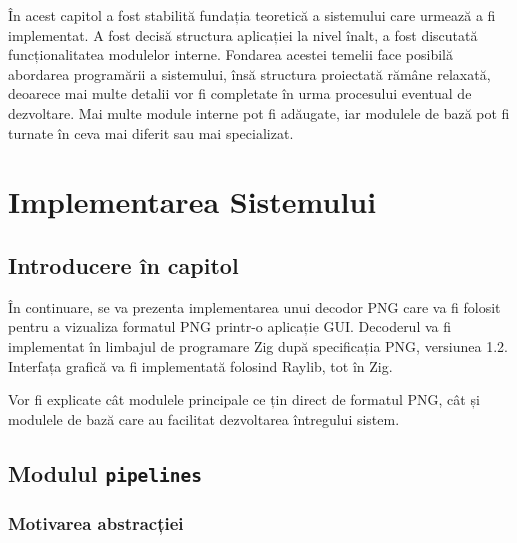 \documentclass[a4paper,12pt]{report}
\begin{document}

În acest capitol a fost stabilită fundația teoretică a sistemului care urmează a fi implementat.
A fost decisă structura aplicației la nivel înalt, a fost discutată funcționalitatea modulelor interne.
Fondarea acestei temelii face posibilă abordarea programării a sistemului,
însă structura proiectată rămâne relaxată, deoarece mai multe detalii
vor fi completate în urma procesului eventual de dezvoltare.
Mai multe module interne pot fi adăugate,
iar modulele de bază pot fi turnate în ceva mai diferit sau mai specializat.

\chapter{Implementarea Sistemului}\label{implementation_chapter_title}

\section{Introducere în capitol}

În continuare, se va prezenta implementarea unui decodor \ac{PNG} care va fi folosit pentru
a vizualiza formatul \ac{PNG} printr-o aplicație \ac{GUI}.
Decoderul va fi implementat în limbajul de programare Zig\cite{zig}
după specificația \ac{PNG}, versiunea 1.2\cite{png_spec}.
Interfața grafică va fi implementată folosind Raylib\cite{raylib}, tot în Zig.

Vor fi explicate cât modulele principale ce țin direct de formatul PNG,
cât și modulele de bază care au facilitat dezvoltarea întregului sistem.

\section{Modulul \texttt{pipelines}}

\subsection{Motivarea abstracției}
\end{document}
